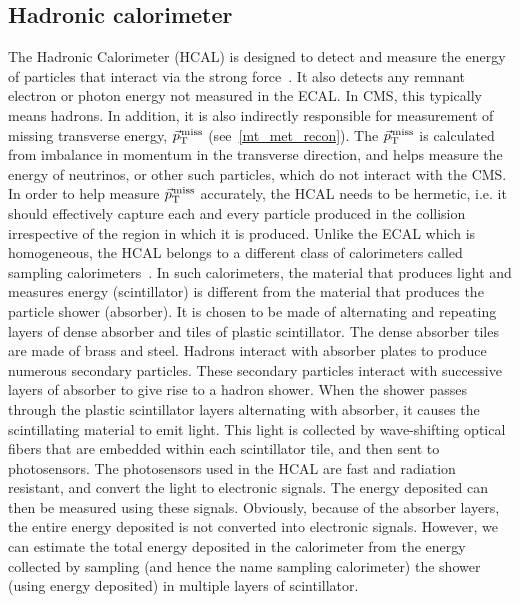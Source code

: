 \subsection{Hadronic calorimeter}
\label{Hcal}
The Hadronic Calorimeter (HCAL) is designed to detect and measure the energy of particles that interact via the strong force~\cite{cms_exp_ref}. It also detects any remnant electron or photon energy not measured in the ECAL. In CMS, this typically means hadrons. In addition, it is also indirectly responsible for measurement of missing transverse energy, ${\vec p}_{\mathrm{T}}^{\kern1pt\text{miss}}$ (see~\ref{mt_met_recon}). The ${\vec p}_{\mathrm{T}}^{\kern1pt\text{miss}}$ is calculated from imbalance in momentum in the transverse direction, and helps measure the energy of neutrinos, or other such particles, which do not interact with the CMS. In order to help measure ${\vec p}_{\mathrm{T}}^{\kern1pt\text{miss}}$ accurately, the HCAL needs to be hermetic, i.e. it should effectively capture each and every particle produced in the collision irrespective of the region in which it is produced. Unlike the ECAL which is homogeneous, the HCAL belongs to a different class of calorimeters called sampling calorimeters~\cite{hcal1}. In such calorimeters, the  material that produces light and measures energy (scintillator) is different from the material that produces the particle shower (absorber). It is chosen to be made of alternating and repeating layers of dense absorber and tiles of plastic scintillator. The dense absorber tiles are made of brass and steel. Hadrons interact with absorber plates to produce numerous secondary particles. These secondary particles interact with successive layers of absorber to give rise to a hadron shower. When the shower passes through the plastic scintillator layers alternating with absorber, it causes the scintillating material to emit light. This light is collected by wave-shifting optical fibers that are embedded within each scintillator tile, and then sent to photosensors. The photosensors used in the HCAL are fast and radiation resistant, and convert the light to electronic signals. The energy deposited can then be measured using these signals. Obviously, because of the absorber layers, the entire energy deposited is not converted into electronic signals. However, we can estimate the total energy deposited in the calorimeter from the energy collected by sampling (and hence the name sampling calorimeter) the shower (using  energy deposited) in multiple layers of scintillator.



